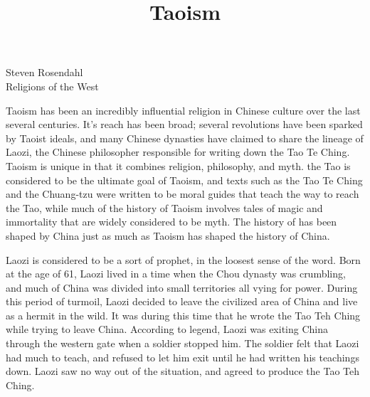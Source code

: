 \documentclass[12pt]{hw}
\title{Taoism}
\date{}
\newcommand{\inlinetitle}{\vspace{-1.5cm}{\let\newpage\relax\maketitle}\vspace{-1.5cm}}
\begin{document}
\noindent Steven Rosendahl\\
\noindent Religions of the West\\
\inlinetitle

Taoism has been an incredibly influential religion in Chinese culture over the last several centuries. It's reach has been broad; several revolutions have been sparked by Taoist ideals, and many Chinese dynasties have claimed to share the lineage of Laozi, the Chinese philosopher responsible for writing down the Tao Te Ching. Taoism is unique in that it combines religion, philosophy, and myth. the Tao is considered to be the ultimate goal of Taoism, and texts such as the Tao Te Ching and the Chuang-tzu were written to be moral guides that teach the way to reach the Tao, while much of the history of Taoism involves tales of magic and immortality that are widely considered to be myth. The history of has been shaped by China just as much as Taoism has shaped the history of China.

Laozi is considered to be a sort of prophet, in the loosest sense of the word. Born at the age of 61, Laozi lived in a time when the Chou dynasty was crumbling, and much of China was divided into small territories all vying for power. During this period of turmoil, Laozi decided to leave the civilized area of China and live as a hermit in the wild. It was during this time that he wrote the Tao Teh Ching while trying to leave China. According to legend, Laozi was exiting China through the western gate when a soldier stopped him. The soldier felt that Laozi had much to teach, and refused to let him exit until he had written his teachings down. Laozi saw no way out of the situation, and agreed to produce the Tao Teh Ching.
\end{document}
